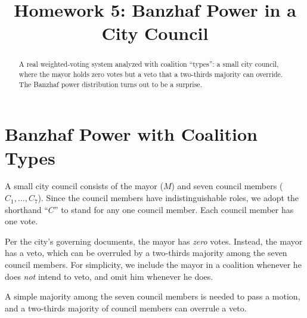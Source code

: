 \documentclass[12pt]{ximera}
\title{Homework 5: Banzhaf Power in a City Council}
\begin{document}
\begin{abstract}
A real weighted-voting system analyzed with coalition ``types'': a small city
council, where the mayor holds zero votes but a veto that a two-thirds majority can
override. The Banzhaf power distribution turns out to be a surprise.
\end{abstract}
\maketitle

\section*{Banzhaf Power with Coalition Types}

A small city council consists of the mayor ($M$) and seven council members
($C_1,\ldots,C_7$). Since the council members have indistinguishable roles, we adopt
the shorthand ``$C$'' to stand for any one council member. Each council member has one
vote.

Per the city's governing documents, the mayor has \emph{zero}
votes. Instead, the mayor has a veto, which can be overruled by a two-thirds majority
among the seven council members. For simplicity, we include the mayor in a coalition
whenever he does \emph{not} intend to veto, and omit him whenever he does.

A simple majority among the seven council members is needed to pass a motion, and a
two-thirds majority of council members can overrule a veto.
\end{document}
